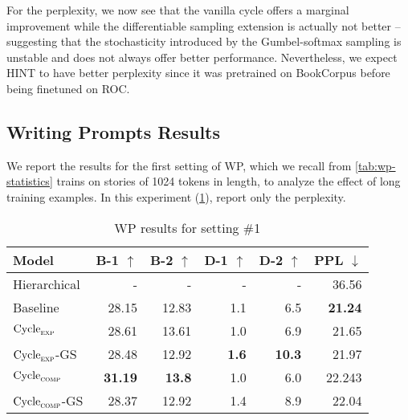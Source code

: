 For the perplexity, we now see that the vanilla cycle offers a marginal improvement while the differentiable sampling extension is actually not better -- suggesting that the stochasticity introduced by the Gumbel-softmax sampling is unstable and does not always offer better performance. Nevertheless, we expect HINT to have better perplexity since it was pretrained on BookCorpus \citep{zhu2015aligning} before being finetuned on ROC. 


\subsection{Writing Prompts Results}
\label{sec:wp_results}

We report the results for the first setting of WP, which we recall from \cref{tab:wp-statistics} trains on stories of 1024 tokens in length, to analyze the effect of long training examples. In this experiment (\cref{table:wp_1_results}), \citep{fan2018hierarchical} report only the perplexity.

\begin{table}[ht]
\centering
\begin{tabular}{l|rr|rr|r}
Model & B-1 $\uparrow$ & B-2 $\uparrow$ & D-1 $\uparrow$ & D-2 $\uparrow$ & PPL $\downarrow$  \\ \hline
Hierarchical & - & - & - & - & 36.56 \\ \hline
Baseline & 28.15 & 12.83 & 1.1 & 6.5  & \textbf{21.24} \\
$\text{Cycle}_{\textsc{exp}}$ & 28.61 & 13.61 & 1.0 & 6.9 & 21.65 \\
$\text{Cycle}_{\textsc{exp}}$-GS & 28.48 & 12.92 & \textbf{1.6} & \textbf{10.3} & 21.97 \\
$\text{Cycle}_{\textsc{comp}}$ & \textbf{31.19} & \textbf{13.8} & 1.0 & 6.0 & 22.243 \\
$\text{Cycle}_{\textsc{comp}}$-GS & 28.37 & 12.92 & 1.4 & 8.9 & 22.04
\end{tabular}
\caption{WP results for setting \#1}
\label{table:wp_1_results}
\end{table}

